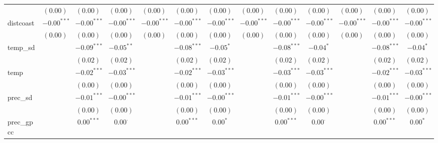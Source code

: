 \begin{sidewaystable}
\begin{center}
{\begin{tabular}{l c c c c c c c c c c c c}
                    & $(0.00)$      & $(0.00)$      & $(0.00)$        & $(0.00)$      & $(0.00)$        & $(0.00)$       & $(0.00)$      & $(0.00)$        & $(0.00)$       & $(0.00)$      & $(0.00)$        & $(0.00)$       \\
distcoast           & $-0.00^{***}$ & $-0.00^{***}$ & $-0.00^{***}$   & $-0.00^{***}$ & $-0.00^{***}$   & $-0.00^{***}$  & $-0.00^{***}$ & $-0.00^{***}$   & $-0.00^{***}$  & $-0.00^{***}$ & $-0.00^{***}$   & $-0.00^{***}$  \\
                    & $(0.00)$      & $(0.00)$      & $(0.00)$        & $(0.00)$      & $(0.00)$        & $(0.00)$       & $(0.00)$      & $(0.00)$        & $(0.00)$       & $(0.00)$      & $(0.00)$        & $(0.00)$       \\
temp\_sd            &               & $-0.09^{***}$ & $-0.05^{**}$    &               & $-0.08^{***}$   & $-0.05^{*}$    &               & $-0.08^{***}$   & $-0.04^{*}$    &               & $-0.08^{***}$   & $-0.04^{*}$    \\
                    &               & $(0.02)$      & $(0.02)$        &               & $(0.02)$        & $(0.02)$       &               & $(0.02)$        & $(0.02)$       &               & $(0.02)$        & $(0.02)$       \\
temp                &               & $-0.02^{***}$ & $-0.03^{***}$   &               & $-0.02^{***}$   & $-0.03^{***}$  &               & $-0.03^{***}$   & $-0.03^{***}$  &               & $-0.02^{***}$   & $-0.03^{***}$  \\
                    &               & $(0.00)$      & $(0.00)$        &               & $(0.00)$        & $(0.00)$       &               & $(0.00)$        & $(0.00)$       &               & $(0.00)$        & $(0.00)$       \\
prec\_sd            &               & $-0.01^{***}$ & $-0.00^{***}$   &               & $-0.01^{***}$   & $-0.00^{***}$  &               & $-0.01^{***}$   & $-0.00^{***}$  &               & $-0.01^{***}$   & $-0.00^{***}$  \\
                    &               & $(0.00)$      & $(0.00)$        &               & $(0.00)$        & $(0.00)$       &               & $(0.00)$        & $(0.00)$       &               & $(0.00)$        & $(0.00)$       \\
prec\_gpcc          &               & $0.00^{***}$  & $0.00^{\cdot}$  &               & $0.00^{***}$    & $0.00^{*}$     &               & $0.00^{***}$    & $0.00^{\cdot}$ &               & $0.00^{***}$    & $0.00^{*}$     \\

\end{tabular}}
\end{center}
\end{sidewaystable}
